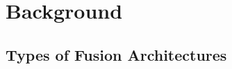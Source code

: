 \documentclass[report.tex]{subfiles}
\begin{document}
    \chapter{Background}

    \section{Types of Fusion Architectures}

    \lipsum[21-30]    
    
\end{document}
